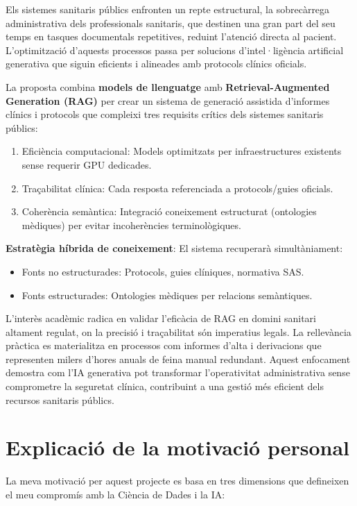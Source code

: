 \documentclass[11pt,a4paper]{article}
\begin{document}
Els sistemes sanitaris públics enfronten un repte estructural, la sobrecàrrega administrativa dels professionals sanitaris, que destinen una gran part del seu temps en tasques documentals repetitives, reduint l'atenció directa al pacient. L'optimització d'aquests processos passa per solucions d'intel·ligència artificial generativa que siguin eficients i alineades amb protocols clínics oficials. 

La proposta combina \textbf{models de llenguatge} amb \textbf{Retrieval-Augmented Generation (RAG)} per crear un sistema de generació assistida d'informes clínics i protocols que compleixi tres requisits crítics dels sistemes sanitaris públics:

\begin{enumerate}
\item Eficiència computacional: Models optimitzats per infraestructures existents sense requerir GPU dedicades.
\item Traçabilitat clínica: Cada resposta referenciada a protocols/guies oficials.
\item Coherència semàntica: Integració coneixement estructurat (ontologies mèdiques) per evitar incoherències terminològiques.
\end{enumerate}

\textbf{Estratègia híbrida de coneixement}: El sistema recuperarà simultàniament:
\begin{itemize}
\item Fonts no estructurades: Protocols, guies clíniques, normativa SAS.
\item Fonts estructurades: Ontologies mèdiques per relacions semàntiques.
\end{itemize}

L'interès acadèmic radica en validar l'eficàcia de RAG en domini sanitari altament regulat, on la precisió i traçabilitat són imperatius legals. La rellevància pràctica es materialitza en processos com informes d'alta i derivacions que representen milers d'hores anuals de feina manual redundant. Aquest enfocament demostra com l'IA generativa pot transformar l'operativitat administrativa sense comprometre la seguretat clínica, contribuint a una gestió més eficient dels recursos sanitaris públics.


\section*{Explicació de la motivació personal}

La meva motivació per aquest projecte es basa en tres dimensions que defineixen el meu compromís amb la Ciència de Dades i la IA:
\end{document}
